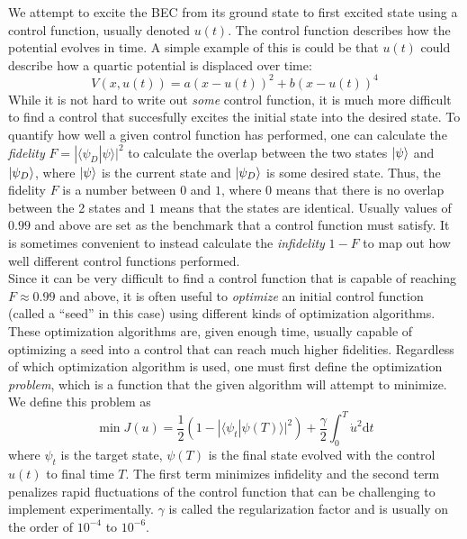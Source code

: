\documentclass[a4paper, twocolumn]{revtex4-1}
\begin{document}
We attempt to excite the BEC from its ground state to first excited state using a control function, usually denoted $u(t)$. The control function describes how the potential evolves in time. A simple example of this is could be that $u(t)$ could describe how a quartic potential is displaced over time:
\begin{equation}
	V(x, u(t)) = a(x-u(t))^2 + b(x-u(t))^4
\end{equation}
While it is not hard to write out \textit{some} control function, it is much more difficult to find a control that succesfully excites the initial state into the desired state. To quantify how well a given control function has performed, one can calculate the \textit{fidelity} $F = | \langle \psi_D | \psi \rangle |^2$ to calculate the overlap between the two states $\ket{\psi}$ and $\ket{\psi_D}$, where $\ket{\psi}$ is the current state and $\ket{\psi_D}$ is some desired state. Thus, the fidelity $F$ is a number between $0$ and $1$, where $0$ means that there is no overlap between the 2 states and $1$ means that the states are identical. Usually values of $0.99$ and above are set as the benchmark that a control function must satisfy. It is sometimes convenient to instead calculate the \textit{infidelity} $1-F$ to map out how well different control functions performed.\\

Since it can be very difficult to find a control function that is capable of reaching $F\approx 0.99$ and above, it is often useful to \textit{optimize} an initial control function (called a ``seed'' in this case) using different kinds of optimization algorithms. These optimization algorithms are, given enough time, usually capable of optimizing a seed into a control that can reach much higher fidelities. Regardless of which optimization algorithm is used, one must first define the optimization \textit{problem}, which is a function that the given algorithm will attempt to minimize. We define this problem as \cite{JensJacobPhDThesis} 
\begin{equation}
	\min J(u) = \frac{1}{2}(1-| \langle \psi_{t} | \psi(T) \rangle|^2) + \frac{\gamma}{2} \int_{0}^{T} \dot{u}^2 \text{d}t
\end{equation}
where $\psi_{t}$ is the target state, $\psi(T)$ is the final state evolved with the control $u(t)$ to final time $T$. The first term minimizes infidelity and the second term penalizes rapid fluctuations of the control function that can be challenging to implement experimentally. $\gamma$ is called the regularization factor and is usually on the order of $10^{-4}$ to $10^{-6}$. \\
\end{document}
